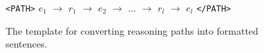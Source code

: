 \begin{figure}[h]
    \centering
    \begin{minipage}{0.99\columnwidth}
        \centering
        \begin{tcolorbox}[title=Path Sentence Template]
            \small
            \texttt{<PATH>} $e_1$ $\to$ $r_1$ $\to$ $e_2$ $\to$ $\ldots$ $\to$ $r_l$ $\to$ $e_l$ \texttt{</PATH>}
        \end{tcolorbox}
    \end{minipage}
    \caption{The template for converting reasoning paths into formatted sentences.}
    \label{fig:path_template}
\end{figure}